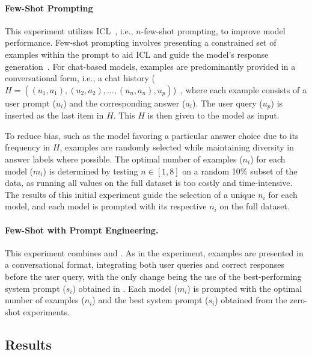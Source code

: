 \paragraph{Few-Shot Prompting}
\label{few-shot-prompt}

This experiment utilizes \ac{ICL}~\cite{brownLanguageModelsAre2020}, i.e., $n$-few-shot prompting, to improve model performance. Few-shot prompting involves presenting a constrained set of examples within the prompt to aid \acl{ICL} and guide the model's response generation~\cite{brownLanguageModelsAre2020}. For chat-based models, examples are predominantly provided in a conversational form, i.e., a chat history ($H = ((u_1, a_1), (u_2, a_2), \ldots, (u_n, a_n), u_p)$)~\cite{HowUseFew}, where each example consists of a user prompt ($u_i$) and the corresponding answer ($a_i$). The user query ($u_p$) is inserted as the last item in $H$. This $H$ is then given to the model as input.

To reduce bias, such as the model favoring a particular answer choice due to its frequency in $H$, examples are randomly selected while maintaining diversity in answer labels where possible. The optimal number of examples ($n_i$) for each model ($m_i$) is determined by testing $n \in [1, 8]$ on a random 10\% subset of the data, as running all values on the full dataset is too costly and time-intensive. The results of this initial experiment guide the selection of a unique $n_i$ for each model, and each model is prompted with its respective $n_i$ on the full dataset.

\paragraph{Few-Shot with Prompt Engineering.}
This experiment combines  and . As in the  experiment, examples are presented in a conversational format, integrating both user queries and correct responses before the user query, with the only change being the use of the best-performing system prompt ($s_i$) obtained in . Each model ($m_i$) is prompted with the optimal number of examples ($n_i$) and the best system prompt ($s_i$) obtained from the zero-shot experiments.

\subsection{Results}

